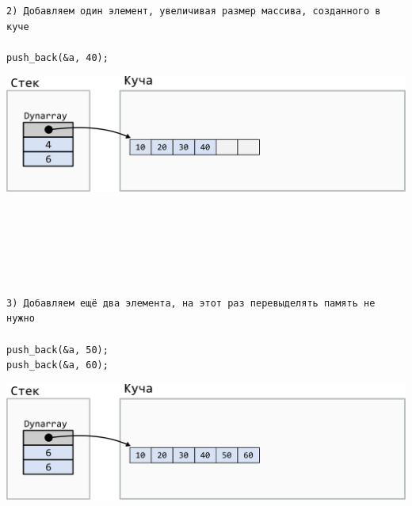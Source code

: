 \documentclass[10pt]{article}
\begin{document}
\noindent\begin{minipage}{.40\textwidth}
\begin{lstlisting}
2) Добавляем один элемент, увеличивая размер массива, созданного в куче

push_back(&a, 40);
\end{lstlisting}
\end{minipage}
\begin{minipage}{.50\textwidth}
\includegraphics[scale=0.8]{../images/dynarray2.png}
\end{minipage}
\quad\\
\quad\\
\quad\\
\quad\\
\quad\\



\noindent\begin{minipage}{.40\textwidth}
\begin{lstlisting}
3) Добавляем ещё два элемента, на этот раз перевыделять память не нужно

push_back(&a, 50);
push_back(&a, 60);
\end{lstlisting}
\end{minipage}
\begin{minipage}{.50\textwidth}
\includegraphics[scale=0.8]{../images/dynarray3.png}
\end{minipage}
\quad\\
\quad\\
\quad\\
\quad\\
\quad\\
\end{document}
